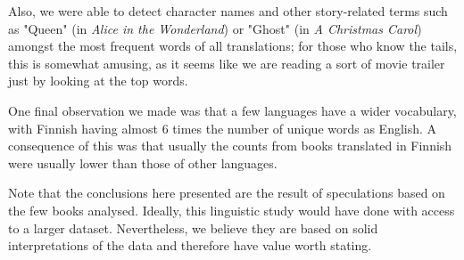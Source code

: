 \documentclass[shortpaper]{revdetua}
\begin{document}
Also, we were able to detect character names and other story-related terms such as "Queen" (in \textit{Alice in the Wonderland}) or "Ghost" (in \textit{A Christmas Carol})
amongst the most frequent words of all translations; for those who know the tails, this is somewhat amusing, as it seems like we are reading a sort of movie 
trailer just by looking at the top words.

One final observation we made was that a few languages have a wider vocabulary, with Finnish having almost 6 times the number of unique words as English.
A consequence of this was that usually the counts from books translated in Finnish were usually lower than those of other languages.

Note that the conclusions here presented are the result of speculations based on the few books analysed.
Ideally, this linguistic study would have done with access to a larger dataset.
Nevertheless, we believe they are based on solid interpretations of the data and therefore have value worth stating.
\end{document}
